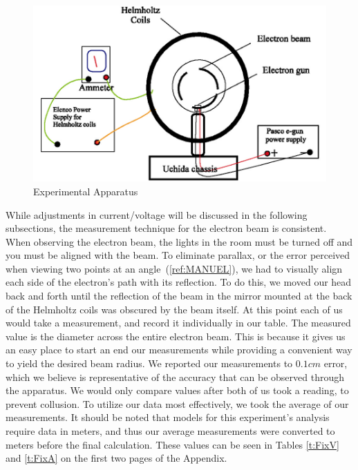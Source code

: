 \documentclass[12pt]{article}
\begin{document}
\begin{figure}
    \centering
    \includegraphics[width=\linewidth]{figures/EOM_Apparatus.png}
    \caption{Experimental Apparatus}
    \label{f:EOM_Apparatus}
\end{figure}

While adjustments in current/voltage will be discussed in the following subsections, the measurement technique for the electron beam is consistent. When observing the electron beam, the lights in the room must be turned off and you must be aligned with the beam. To eliminate parallax, or the error perceived when viewing two points at an angle~(\ref{ref:MANUEL}), we had to visually align each side of the electron's path with its reflection. To do this, we moved our head back and forth until the reflection of the beam in the mirror mounted at the back of the Helmholtz coils was obscured by the beam itself. At this point each of us would take a measurement, and record it individually in our table. The measured value is the diameter across the entire electron beam. This is because it gives us an easy place to start an end our measurements while providing a convenient way to yield the desired beam radius. We reported our measurements to $0.1 cm$ error, which we believe is representative of the accuracy that can be observed through the apparatus. We would only compare values after both of us took a reading, to prevent collusion. To utilize our data most effectively, we took the average of our measurements. It should be noted that models for this experiment's analysis require data in meters, and thus our average measurements were converted to meters before the final calculation. These values can be seen in Tables \ref{t:FixV} and \ref{t:FixA} on the first two pages of the Appendix.
\end{document}
